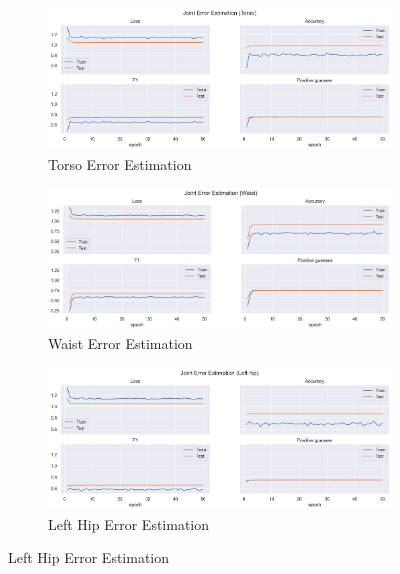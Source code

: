 \begin{figure}[!htbp]
  \centering
  \begin{subfigure}[b]{0.47\linewidth}
      \centering
      \includegraphics[width=\textwidth]{figures/Results/v1/jt/Torso_ErrorEstimation.png}
      \caption{Torso Error Estimation}
      \label{fig:v1_torso_jt_ee}
  \end{subfigure}
  \hfill
  \begin{subfigure}[b]{0.47\linewidth}
    \centering
    \includegraphics[width=\textwidth]{figures/Results/v1/jt/Waist_ErrorEstimation.png}
    \caption{Waist Error Estimation}
    \label{fig:v1_waist_jt_ee}
  \end{subfigure}
  \hfill
  \begin{subfigure}[b]{0.47\linewidth}
      \centering
      \includegraphics[width=\textwidth]{figures/Results/v1/jt/Left hip_ErrorEstimation.png}
      \caption{Left Hip Error Estimation}
      \label{fig:v1_lehi_jt_ee}

\end{subfigure}
\end{figure}
